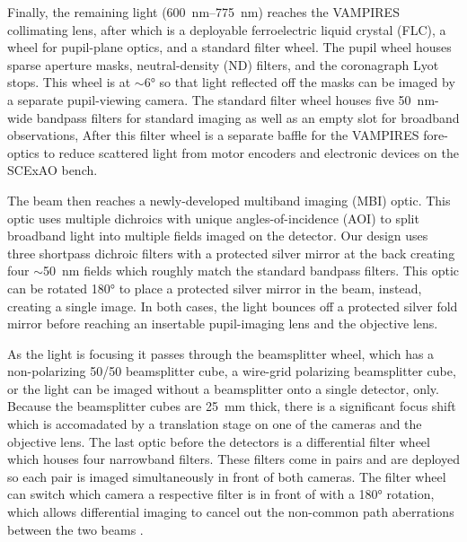 Finally, the remaining light (\SIrange{600}{775}{\nano\meter}) reaches the VAMPIRES collimating lens, after which is a deployable ferroelectric liquid crystal (FLC), a wheel for pupil-plane optics, and a standard filter wheel. The pupil wheel houses sparse aperture masks, neutral-density (ND) filters, and the coronagraph Lyot stops. This wheel is at $\sim$\ang{6} so that light reflected off the masks can be imaged by a separate pupil-viewing camera. The standard filter wheel houses five \SI{50}{\nano\meter}-wide bandpass filters for standard imaging as well as an empty slot for broadband observations, After this filter wheel is a separate baffle for the VAMPIRES fore-optics to reduce scattered light from motor encoders and electronic devices on the SCExAO bench. 

The beam then reaches a newly-developed multiband imaging (MBI) optic. This optic uses multiple dichroics with unique angles-of-incidence (AOI) to split broadband light into multiple fields imaged on the detector. Our design uses three shortpass dichroic filters with a protected silver mirror at the back creating four $\sim$\SI{50}{\nano\meter} fields which roughly match the standard bandpass filters. This optic can be rotated \ang{180} to place a protected silver mirror in the beam, instead, creating a single image. In both cases, the light bounces off a protected silver fold mirror before reaching an insertable pupil-imaging lens and the objective lens.

As the light is focusing it passes through the beamsplitter wheel, which has a non-polarizing 50/50 beamsplitter cube, a wire-grid polarizing beamsplitter cube, or the light can be imaged without a beamsplitter onto a single detector, only. Because the beamsplitter cubes are \SI{25}{\milli\meter} thick, there is a significant focus shift which is accomadated by a translation stage on one of the cameras and the objective lens. The last optic before the detectors is a differential filter wheel which houses four narrowband filters. These filters come in pairs and are deployed so each pair is imaged simultaneously in front of both cameras. The filter wheel can switch which camera a respective filter is in front of with a \ang{180} rotation, which allows differential imaging to cancel out the non-common path aberrations between the two beams \citep{uyama_high-contrast_2020}.

